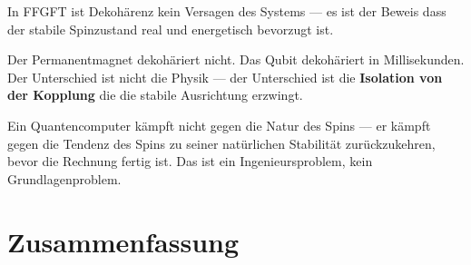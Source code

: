 \begin{keypoint}
In FFGFT ist Dekohärenz kein Versagen des Systems ---
es ist der Beweis dass der stabile Spinzustand real und
energetisch bevorzugt ist.

Der Permanentmagnet dekohäriert nicht.
Das Qubit dekohäriert in Millisekunden.
Der Unterschied ist nicht die Physik ---
der Unterschied ist die \textbf{Isolation von der Kopplung}
die die stabile Ausrichtung erzwingt.

Ein Quantencomputer kämpft nicht gegen die Natur des Spins ---
er kämpft gegen die Tendenz des Spins zu seiner natürlichen
Stabilität zurückzukehren, bevor die Rechnung fertig ist.
Das ist ein Ingenieursproblem, kein Grundlagenproblem.
\end{keypoint}

\section{Zusammenfassung}
\label{sec:zusammenfassung-178}

